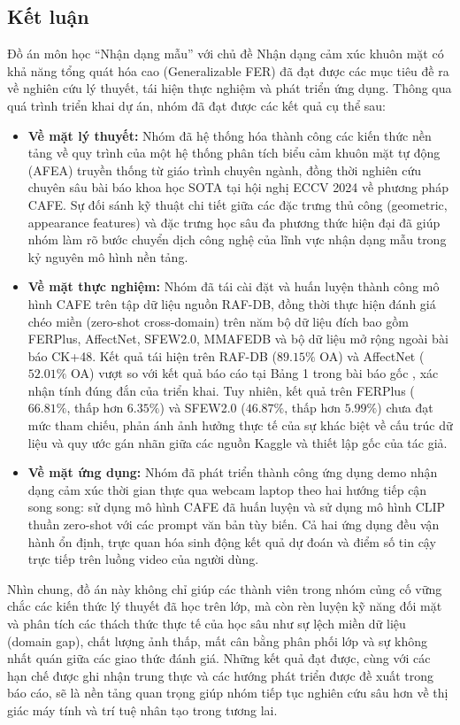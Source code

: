 \subsection{Kết luận}

Đồ án môn học ``Nhận dạng mẫu'' với chủ đề Nhận dạng cảm xúc khuôn mặt có khả năng tổng quát hóa cao (Generalizable FER) đã đạt được các mục tiêu đề ra về nghiên cứu lý thuyết, tái hiện thực nghiệm và phát triển ứng dụng. Thông qua quá trình triển khai dự án, nhóm đã đạt được các kết quả cụ thể sau:

\begin{itemize}
    \item \textbf{Về mặt lý thuyết:} Nhóm đã hệ thống hóa thành công các kiến thức nền tảng về quy trình của một hệ thống phân tích biểu cảm khuôn mặt tự động (AFEA) truyền thống từ giáo trình chuyên ngành, đồng thời nghiên cứu chuyên sâu bài báo khoa học SOTA tại hội nghị ECCV 2024 về phương pháp CAFE. Sự đối sánh kỹ thuật chi tiết giữa các đặc trưng thủ công (geometric, appearance features) và đặc trưng học sâu đa phương thức hiện đại đã giúp nhóm làm rõ bước chuyển dịch công nghệ của lĩnh vực nhận dạng mẫu trong kỷ nguyên mô hình nền tảng.
    \item \textbf{Về mặt thực nghiệm:} Nhóm đã tái cài đặt và huấn luyện thành công mô hình CAFE trên tập dữ liệu nguồn RAF-DB, đồng thời thực hiện đánh giá chéo miền (zero-shot cross-domain) trên năm bộ dữ liệu đích bao gồm FERPlus, AffectNet, SFEW2.0, MMAFEDB và bộ dữ liệu mở rộng ngoài bài báo CK+48. Kết quả tái hiện trên RAF-DB ($89.15\%$ OA) và AffectNet ($52.01\%$ OA) vượt so với kết quả báo cáo tại Bảng 1 trong bài báo gốc \cite{zhang2024generalizable}, xác nhận tính đúng đắn của triển khai. Tuy nhiên, kết quả trên FERPlus ($66.81\%$, thấp hơn $6.35\%$) và SFEW2.0 ($46.87\%$, thấp hơn $5.99\%$) chưa đạt mức tham chiếu, phản ánh ảnh hưởng thực tế của sự khác biệt về cấu trúc dữ liệu và quy ước gán nhãn giữa các nguồn Kaggle và thiết lập gốc của tác giả.
    \item \textbf{Về mặt ứng dụng:} Nhóm đã phát triển thành công ứng dụng demo nhận dạng cảm xúc thời gian thực qua webcam laptop theo hai hướng tiếp cận song song: sử dụng mô hình CAFE đã huấn luyện và sử dụng mô hình CLIP thuần zero-shot với các prompt văn bản tùy biến. Cả hai ứng dụng đều vận hành ổn định, trực quan hóa sinh động kết quả dự đoán và điểm số tin cậy trực tiếp trên luồng video của người dùng.
\end{itemize}

Nhìn chung, đồ án này không chỉ giúp các thành viên trong nhóm củng cố vững chắc các kiến thức lý thuyết đã học trên lớp, mà còn rèn luyện kỹ năng đối mặt và phân tích các thách thức thực tế của học sâu như sự lệch miền dữ liệu (domain gap), chất lượng ảnh thấp, mất cân bằng phân phối lớp và sự không nhất quán giữa các giao thức đánh giá. Những kết quả đạt được, cùng với các hạn chế được ghi nhận trung thực và các hướng phát triển được đề xuất trong báo cáo, sẽ là nền tảng quan trọng giúp nhóm tiếp tục nghiên cứu sâu hơn về thị giác máy tính và trí tuệ nhân tạo trong tương lai.